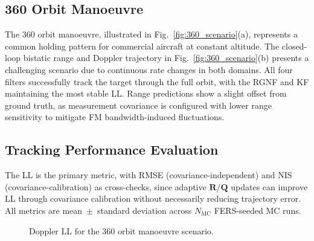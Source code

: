 \documentclass[conference]{IEEEtran}
\begin{document}
\subsection{360\textdegree{} Orbit Manoeuvre}

The 360\textdegree{} orbit manoeuvre, illustrated in Fig.~\ref{fig:360_scenario}(a), represents a common holding pattern for commercial aircraft at constant altitude. The closed-loop bistatic range and Doppler trajectory in Fig.~\ref{fig:360_scenario}(b) presents a challenging scenario due to continuous rate changes in both domains. All four filters successfully track the target through the full orbit, with the RGNF and KF maintaining the most stable LL. Range predictions show a slight offset from ground truth, as measurement covariance is configured with lower range sensitivity to mitigate FM bandwidth-induced fluctuations.




\subsection{Tracking Performance Evaluation}
The LL is the primary metric, with RMSE (covariance-independent) and NIS (covariance-calibration) as cross-checks, since adaptive $\mathbf{R}$/$\mathbf{Q}$ updates can improve LL through covariance calibration without necessarily reducing trajectory error. All metrics are mean~$\pm$~standard deviation across $N_{\mathrm{MC}}$ FERS-seeded MC runs.

\begin{figure}[t]
  \centering
  
  \caption{Doppler LL for the 360\textdegree{} orbit manoeuvre scenario.}
  \label{fig:dopplerLogLike360}
\end{figure}
\end{document}
